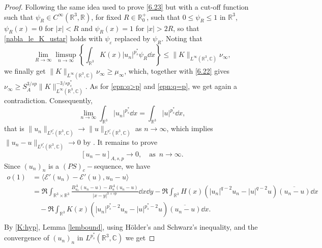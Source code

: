 \documentclass[leqno,11pt]{amsart}
\newcommand{\R}{\mathbb R}
\newcommand{\CC}{\mathbb C}
\newcommand{\C}{\mathbb C}
\newcommand{\cE}{{\mathcal E}}
\newcommand{\eps}{\varepsilon}
\numberwithin{equation}{section}
\begin{document}
\begin{proof}
Following the same idea used to prove \eqref{6.23} but with a cut-off function such that $\psi_{R}\in C^{\infty}(\R^3,\R)$, for fixed $R\in\R_0^+$,
such that $0\le\psi_{R}\le1$ in $\R^{3}$, $\psi_R(x)=0$ for $|x|<R$ and $\psi_{R}(x)=1$ for $|x|>2R$, so that \eqref{nabla_le_K_ustar} holds with $\psi_\eps$ replaced by $\psi_R$.
Noting that
$$
    \lim_{R\to\infty}\limsup_{n\to\infty}\left\{\int_{\R^3}K(x)|u_{n}|^{p^*_s}\psi_{R}\dd x\right\} \le\|K\|_{L^\infty(\R^3, \CC)}\nu_{\infty},
$$
we finally get
$\|K\|_{L^\infty(\R^3, \CC)}\nu_\infty\ge\mu_\infty$,
which, together with \eqref{6.22} gives $\nu_{\infty}\ge  S_A^{3/sp}\|K\|_{L^\infty(\R^3, \CC)}^{-3/sp^*_s}$.
As for \eqref{epn:q>p} and \eqref{epn:q=p}, we get again a contradiction. 
Consequently,
$$
    \lim_{n\to\infty}\int_{\R^3}|u_{n}|^{p^*_s}\dd x=\int_{\R^3}|u|^{p^*_s}\dd x,
$$
that is $\|u_n\|_{L^{p^*_s}(\R^3, \CC)} \to \|u\|_{L^{p^*_s}(\R^3, \CC)}$ as $n\to\infty$, which implies $\|u_n-u\|_{L^{p^*_s}(\R^3, \CC)}\to 0$ by \cite[Proposition 3.32]{Brezis}. It remains to prove 
\begin{equation}\label{claimfin}
[u_n-u]_{A,s,p}\to0, \quad \text{as}\,\,\,n\to\infty.
\end{equation}
Since $(u_n)_n$ is a $(PS)_c-$sequence, we have
\begin{equation}\label{g-11}
\begin{aligned}
    o(1)
    &=\langle \cE'(u_n)-\cE'(u),u_n-u\rangle\\
    &=\Re \int_{\R^3\times \R^3}\frac{B^A_{u_n}(u_n-u)-B^A_{u}(u_n-u)}{|x-y|^{3+sp}}\dd x \dd y
    -\Re\int_{\R^3}H(x) (|u_n|^{q-2}u_n-|u|^{q-2}u)\overline{(u_n-u)}\dd x
    \\ 
    &\quad-\Re\int_{\R^3}K(x) (|u_n|^{p^*_s-2}u_n-|u|^{p^*_s-2}u)\overline{(u_n-u)}\dd x.\\
\end{aligned}
\end{equation}
By \eqref{K:hyp}, Lemma \ref{lembound}, using H\"older's and Schwarz's inequality, and the convergence of $(u_n)_n$ in $L^{p^*_s}(\R^3,\C)$ we get
 

\end{proof}
\end{document}
